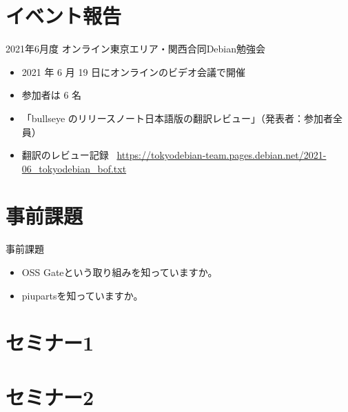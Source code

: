 \section{イベント報告}

\begin{frame}{2021年6月度 オンライン東京エリア・関西合同Debian勉強会}
\begin{itemize}
\item 2021 年 6 月 19 日にオンラインのビデオ会議で開催
\item 参加者は 6 名
\item 「bullseye のリリースノート日本語版の翻訳レビュー」（発表者：参加者全員）
\item 翻訳のレビュー記録 \
  \url{https://tokyodebian-team.pages.debian.net/2021-06_tokyodebian_bof.txt}
\end{itemize}
\end{frame}


\section{事前課題}


\begin{frame}{事前課題}
  \begin{itemize}
  \item OSS Gateという取り組みを知っていますか。
  \item piupartsを知っていますか。
  \end{itemize}
\end{frame}

{\footnotesize
  
}

%

\section{セミナー1}

\section{セミナー2}


